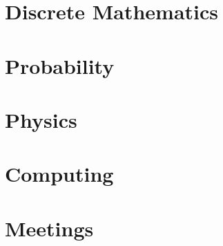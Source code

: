 	
	\vspace{-0cm}
	
	\newpage
	
	
	
	\tableofcontents
	
%	

	
	
	\part{Discrete Mathematics}
	
	
	
	
	\part{Probability}
	
	
	
	
	\part{Physics}
	
	
	\part{Computing}
	
	
	
	
	\part{Meetings}
	
	

	
	
	


	

	
	

